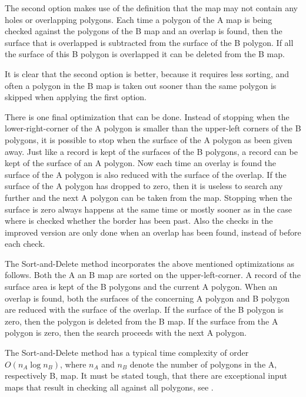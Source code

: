 The second option makes use of the definition that the map
may not contain any holes or overlapping polygons.
Each time a polygon of the A map is being checked against
the polygons of the B map and an overlap is found,
then the surface that is overlapped is subtracted from the
surface of the B polygon.
If all the surface of this B polygon is overlapped it can be
deleted from the B map.

It is clear that the second option is better, because
it requires less sorting, and often a polygon in the B map is
taken out sooner than the same polygon is skipped when applying
the first option.

There is one final optimization that can be done.
Instead of stopping when the lower-right-corner of the A
polygon is smaller than the upper-left corners of the B
polygons, it is possible to stop when the surface of the A
polygon as been given away.
Just like a record is kept of the surfaces of the B polygons,
a record can be kept of the surface of an A polygon.
Now each time an overlay is found the surface of the A
polygon is also reduced with the surface of the overlap.
If the surface of the A polygon has dropped to zero, then it
is useless to search any further and the next A polygon can
be taken from the map.
Stopping when the surface is zero always happens at the
same time or mostly sooner as in the case where is checked
whether the border has been past.
Also the checks in the improved version are only done when
an overlap has been found, instead of before each check.

The Sort-and-Delete method incorporates the above mentioned
optimizations as follows.
Both the A an B map are sorted on the upper-left-corner.
A record of the surface area is kept of the B polygons and
the current A polygon.
When an overlap is found, both the surfaces of the
concerning A polygon and B polygon are reduced with the
surface of the overlap.
If the surface of the B polygon is zero, then the polygon is
deleted from the B map.
If the surface from the A polygon is zero, then the search
proceeds with the next A polygon.

The Sort-and-Delete method has a typical time complexity of order
$O ( n_A \log n_B )$, where $n_A$ and $n_B$ denote the number of polygons
in the A, respectively B, map.
It must be stated tough, that there are exceptional input maps that result
in checking all against all polygons, see
.

\begin{figure}[hbtp]
  \begin{centering}
    \hspace{0cm}
  \end{centering}
\end{figure}

